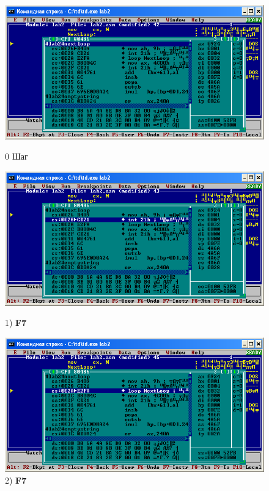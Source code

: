 \begin{figure}[!htp]
    \centering
    \begin{minipage}{0.32\textwidth}
        \centering
        \includegraphics[width=.99\linewidth]
            {../_INCLUDES/task-4-9/0.png}
        \caption{0 Шаг}
        \label{fig:task_4_9}
    \end{minipage}
    \begin {minipage}{0.32\textwidth}
        \centering
        \includegraphics[width=.99\linewidth]
            {../_INCLUDES/task-4-9/1.png}
        \caption{1) \textbf{F7}}
        \label{fig:task_4_9}
    \end{minipage}
    \begin {minipage}{0.32\textwidth}
        \centering
        \includegraphics[width=.99\linewidth]
            {../_INCLUDES/task-4-9/2.png}
        \caption{2) \textbf{F7}}
        \label{fig:task_4_9}
    \end{minipage}
\end{figure}

